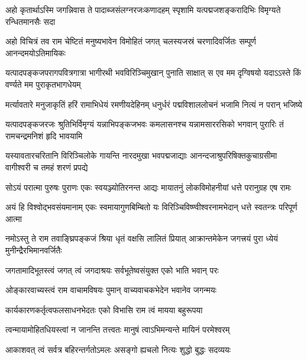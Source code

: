 \addtocounter{shlokacount}{42}

\fourlineindentedshloka
{अहो कृतार्थाऽस्मि जगन्निवास ते}
{पादाब्जसंलग्नरजःकणादहम्}
{स्पृशामि यत्पद्मजशङ्करादिभिः}
{विमृग्यते रन्धितमानसैः सदा}%

\fourlineindentedshloka
{अहो विचित्रं तव राम चेष्टितं}
{मनुष्यभावेन विमोहितं जगत्}
{चलस्यजस्रं चरणादिवर्जितः}
{सम्पूर्ण आनन्दमयोऽतिमायिकः}%

\fourlineindentedshloka
{यत्पादपङ्कजपरागपवित्रगात्रा}
{भागीरथी भवविरिञ्चिमुखान्  पुनाति}
{साक्षात् स एव मम दृग्विषयो यदाऽऽस्ते}
{किं वर्ण्यते मम पुराकृतभागधेयम्}%

\fourlineindentedshloka
{मर्त्यावतारे मनुजाकृतिं हरिं}
{रामाभिधेयं रमणीयदेहिनम्}
{धनुर्धरं पद्मविशाललोचनं}
{भजामि नित्यं न परान्  भजिष्ये}%

\fourlineindentedshloka
{यत्पादपङ्कजरजः श्रुतिभिर्विमृग्यं}
{यन्नाभिपङ्कजभवः कमलासनश्च}
{यन्नामसाररसिको भगवान् पुरारिः}
{तं  रामचन्द्रमनिशं हृदि भावयामि}%

\fourlineindentedshloka
{यस्यावतारचरितानि विरिञ्चिलोके}
{गायन्ति नारदमुखा भवपद्मजाद्याः}
{आनन्दजाश्रुपरिषिक्तकुचाग्रसीमा}
{वागीश्वरी च तमहं शरणं प्रपद्ये}%

\fourlineindentedshloka
{सोऽयं परात्मा पुरुषः पुराणः}
{एकः स्वयञ्ज्योतिरनन्त आद्यः}
{मायातनुं लोकविमोहनीयां}
{धत्ते परानुग्रह एष रामः}%

\fourlineindentedshloka
{अयं हि विश्वोद्भवसंयमानाम्}
{एकः  स्वमायागुणबिम्बितो यः}
{विरिञ्चिविष्ण्वीश्वरनामभेदान्}
{धत्ते स्वतन्त्रः परिपूर्ण आत्मा}%

\fourlineindentedshloka
{नमोऽस्तु ते राम तवाङ्घ्रिपङ्कजं}
{श्रिया धृतं वक्षसि लालितं प्रियात्}
{आक्रान्तमेकेन जगत्त्रयं पुरा}
{ध्येयं मुनीन्द्रैरभिमानवर्जितैः}%

\twolineshloka
{जगतामादिभूतस्त्वं जगत् त्वं जगदाश्रयः}
{सर्वभूतेष्वसंयुक्त एको भाति भवान् परः}%

\twolineshloka
{ओङ्कारवाच्यस्त्वं राम वाचामविषयः पुमान्}
{वाच्यवाचकभेदेन भवानेव जगन्मयः}%

\twolineshloka
{कार्यकारणकर्तृत्वफलसाधनभेदतः}
{एको विभासि राम त्वं मायया बहुरूपया}%

\twolineshloka
{त्वन्मायामोहितधियस्त्वां न जानन्ति तत्त्वतः}
{मानुषं त्वाऽभिमन्यन्ते मायिनं परमेश्वरम्}%

\twolineshloka
{आकाशवत् त्वं सर्वत्र बहिरन्तर्गतोऽमलः}
{असङ्गो ह्यचलो नित्यः शुद्धो बुद्धः सदव्ययः}%

